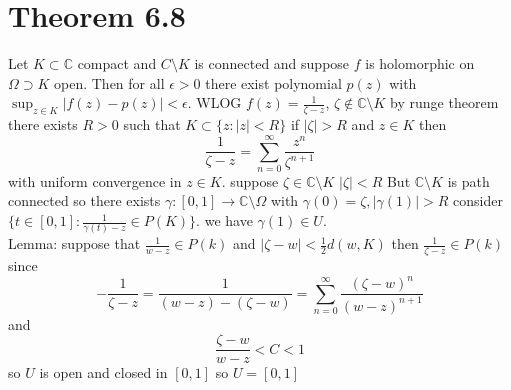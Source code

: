 \documentclass[11pt]{article}
\begin{document}
\section{Theorem 6.8}
Let $K \subset \mathbb{C}$ compact and $C \setminus K$ is connected and suppose  $f$ is holomorphic on $\Omega \supset K$ open. Then for all  $\epsilon > 0$
there exist polynomial $p(z)$ with  $\sup_{z \in K} |f(z) - p(z)| < \epsilon$. WLOG $f(z) = \frac{1}{\zeta - z}$, $\zeta \not\in \mathbb{C} \setminus K$ by runge theorem
there exists $ R > 0$ such that  $K \subset \{z : |z| < R\}$ if $|\zeta| > R$ and  $z \in K$ then
 \[
\frac{1}{\zeta - z} = \sum_{n=0}^{\infty}\frac{z^{n}}{\zeta^{n+1}}
\] 
with uniform convergence in $z \in K$. suppose  $\zeta \in \mathbb{C} \setminus K$ $|\zeta| < R$
But  $ \mathbb{C} \setminus K$ is path connected so there exists $\gamma : [0,1] \rightarrow \mathbb{C} \setminus \Omega$ with $\gamma(0) = \zeta, |\gamma(1)| > R$
consider $\{t \in [0,1] : \frac{1}{\gamma(t) - z} \in P(K)\}$. we have $\gamma(1) \in U$. \\
Lemma: suppose that $\frac{1}{w - z} \in P(k)$ and $|\zeta - w| < \frac{1}{2}d(w,K)$ then  $\frac{1}{\zeta - z} \in P(k)$ 
since
\[
-\frac{1}{\zeta - z} = \frac{1}{(w-z)-(\zeta-w)} = \sum_{n=0}^{\infty} \frac{(\zeta-w)^{n}}{(w-z)^{n+1}}
\] 
and
\[
    \frac{\zeta - w}{w-z} < C < 1
\] 
so $U$ is open and closed in $[0,1]$ so  $U = [0,1]$
\end{document}

